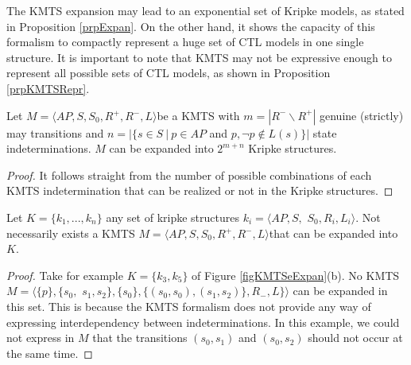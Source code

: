 \documentclass{llncs}
\newcommand{\kmtsdef}[1][]{{{$M{#1} = \langle AP{#1}, S{#1}, S{#1}_{0}, R{#1}^{+}, R{#1}^{-}, L{#1} \rangle$}\;}}
\begin{document}
The KMTS expansion may lead to an exponential set of Kripke models, as stated in Proposition \ref{prpExpan}. On the other hand, it shows the capacity of this formalism to compactly represent a huge set of CTL models in one single structure. It is important to note that KMTS may not be expressive enough to represent all possible sets of CTL models, as shown in Proposition \ref{prpKMTSRepr}.

\begin{proposition}\label{prpExpan}
Let \kmtsdef be a KMTS with $ m=|R^- \backslash R^+|$ genuine (strictly) may transitions and $n= |\{s \in S ~|~ p \in AP$ and $p, \neg p \not\in L(s)\}|$ state indeterminations. $M$ can be expanded into $2^{m+n}$ Kripke structures.
\begin{proof}
It follows straight from the number of possible combinations of each KMTS indetermination that can be realized or not in the Kripke structures. 
\end{proof}
\end{proposition}

\begin{proposition}\label{prpKMTSRepr}
Let $K = \{k_{1},...,k_{n}\}$ any set of kripke structures $k_{i} = \langle AP, S,$ $S_{0},R_{i}, L_{i}\rangle$. Not necessarily exists a KMTS \kmtsdef that can be expanded into $K$.
\begin{proof}
Take for example $K = \{k_3, k_5\}$ of Figure \ref{figKMTSeExpan}(b). No KMTS $M = \langle \{p\}, \{s_{0},$ $ s_{1}, s_{2}\}, \{s_{0}\}, \{(s_{0}, s_{0}), (s_{1}, s_{2})\}, R_{-}, L\}\rangle$ can be expanded in this set. This is because the KMTS formalism does not provide any way of expressing interdependency between indeterminations. In this example, we could not express in $M$ that the transitions $(s_0,s_1)$ and $(s_0,s_2)$ should not occur at the same time. 
\end{proof}
\end{proposition}

\end{document}
